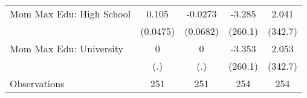 {\begin{tabular}{l*{4}{c}}
\addlinespace
Mom Max Edu: High School&       0.105\sym{*}  &     -0.0273         &      -3.285         &       2.041         \\
                    &    (0.0475)         &    (0.0682)         &     (260.1)         &     (342.7)         \\
\addlinespace
Mom Max Edu: University&           0         &           0         &      -3.353         &       2.053         \\
                    &         (.)         &         (.)         &     (260.1)         &     (342.7)         \\
\midrule
Observations        &         251         &         251         &         254         &         254         \\
\bottomrule
\end{tabular}
}
